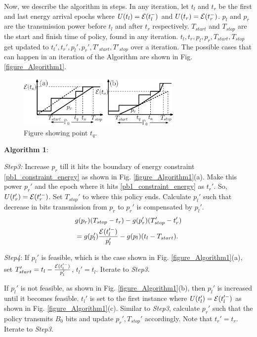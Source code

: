 Now, we describe the algorithm in steps. In any iteration, let $t_{l}$ and $t_{r}$ be the first and last energy arrival epochs where $U(t_l)=\mathcal{E}(t_l^-)$ and $U(t_r)=\mathcal{E}(t_r^-)$. $p_l$ and $p_r$ are the transmission power before $t_l$ and after $t_r$ respectively. $T_{start}$ and $T_{stop}$ are the start and finish time of policy, found in any iteration. $t_l, t_r, p_l, p_r, T_{start}, T_{stop}$ get updated to $t_l', t_r', p_l', p_r', T'_{start}, T'_{stop}$ over a iteration. 
The possible cases that can happen in an iteration of the Algorithm are shown in Fig. \ref{figure_Algorithm1}.
\begin{figure}
\centering
  \centerline{\includegraphics[width=8cm]{straight.eps}}
\caption{Figure showing point $t_q$.}\label{straight}
\end{figure}




\textbf{Algorithm 1}:

\textit{Step3:} Increase $p_r$ till it hits the boundary of energy constraint \eqref{pb1_constraint_energy} as shown in Fig. \ref{figure_Algorithm1}(a). Make this power $p_r'$ and the epoch where it hits \eqref{pb1_constraint_energy} as $t_r'$. So, $U(t_r') = \mathcal{E}(t_r'^-)$. Set $T_{stop}'$ to where this policy ends. Calculate $p_l'$ such that decrease in bits transmission from $p_r$ to $p_r'$ is compensated by $p_l'$.
\begin{align}
&\nonumber g(p_r)(T_{stop}-t_r)-g(p_r')(T_{stop}'-t_r')\\
&=g(p_l')\frac{\ETx(t_l'^-)}{p_l'}-g(p_l)(t_l-T_{start}).
\label{eq_example1}
\end{align}

\textit{Step4}: If $p_l'$ is feasible, which is the case shown in Fig. \ref{figure_Algorithm1}(a), set $T_{start}'=t_l-\frac{\mathcal{E}(t_l'^-)}{p_l'}$, $t_l'=t_l$. Iterate to \textit{Step3}. 

If $p_l'$ is not feasible, as shown in Fig. \ref{figure_Algorithm1}(b), then $p_l'$ is increased until it becomes feasible. $t_l'$ is set to the first instance where $U(t_l') = \mathcal{E}(t_l'^-)$ as shown in Fig. \ref{figure_Algorithm1}(c). Similar to \textit{Step3}, calculate $p_r'$ such that the policy transmits $B_0$ bits and update $p_r',T_{stop}'$ accordingly. Note that $t_r'=t_r$. Iterate to \textit{Step3}.




